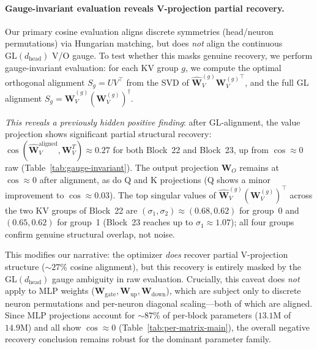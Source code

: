\documentclass{article}
\newcommand{\bW}{\mathbf{W}}
\begin{document}
\paragraph{Gauge-invariant evaluation reveals V-projection partial recovery.}
Our primary cosine evaluation aligns discrete symmetries (head/neuron permutations) via Hungarian matching, but does \emph{not} align the continuous $\mathrm{GL}(d_\text{head})$ V/O gauge.  To test whether this masks genuine recovery, we perform gauge-invariant evaluation: for each KV group $g$, we compute the optimal orthogonal alignment $S_g = UV^\top$ from the SVD of $\hat{\bW}_V^{(g)} {\bW_V^{(g)}}^\top$, and the full GL alignment $S_g = \hat{\bW}_V^{(g)} (\bW_V^{(g)})^\dagger$.

\emph{This reveals a previously hidden positive finding}: after GL-alignment, the value projection shows significant partial structural recovery: $\cos(\hat{\bW}_V^{\text{aligned}}, \bW_V^T) \approx 0.27$ for both Block~22 and Block~23, up from $\cos \approx 0$ raw (Table~\ref{tab:gauge-invariant}).  The output projection $\bW_O$ remains at $\cos \approx 0$ after alignment, as do Q and K projections (Q shows a minor improvement to $\cos \approx 0.03$).  The top singular values of $\hat{\bW}_V^{(g)} (\bW_V^{(g)})^\top$ across the two KV groups of Block~22 are $(\sigma_1, \sigma_2) \approx (0.68, 0.62)$ for group~0 and $(0.65, 0.62)$ for group~1 (Block~23 reaches up to $\sigma_1 \approx 1.07$); all four groups confirm genuine structural overlap, not noise.

This modifies our narrative: the optimizer \emph{does} recover partial V-projection structure ($\sim 27\%$ cosine alignment), but this recovery is entirely masked by the GL$(d_\text{head})$ gauge ambiguity in raw evaluation.  Crucially, this caveat does \emph{not} apply to MLP weights ($\bW_\text{gate}, \bW_\text{up}, \bW_\text{down}$), which are subject only to discrete neuron permutations and per-neuron diagonal scaling---both of which are aligned.  Since MLP projections account for $\sim 87\%$ of per-block parameters ($13.1\text{M}$ of $14.9\text{M}$) and all show $\cos \approx 0$ (Table~\ref{tab:per-matrix-main}), the overall negative recovery conclusion remains robust for the dominant parameter family.
\end{document}
